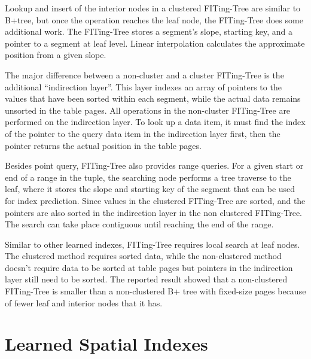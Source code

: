 Lookup and insert of the interior nodes in a clustered FITing-Tree are similar to B+tree, but once the operation reaches the leaf node, the FITing-Tree does some additional work. The FITing-Tree stores a segment's slope, starting key, and a pointer to a segment at leaf level. Linear interpolation calculates the approximate position from a given slope. 

The major difference between a non-cluster and a cluster FITing-Tree is the additional “indirection layer”. This layer indexes an array of pointers to the values that have been sorted within each segment, while the actual data remains unsorted in the table pages. All operations in the non-cluster FITing-Tree are performed on the indirection layer. To look up a data item, it must find the index of the pointer to the query data item in the indirection layer first, then the pointer returns the actual position in the table pages.

Besides point query, FITing-Tree also provides range queries. For a given start or end of a range in the tuple, the searching node performs a tree traverse to the leaf, where it stores the slope and starting key of the segment that can be used for index prediction. Since values in the clustered FITing-Tree are sorted, and the pointers are also sorted in the indirection layer in the non clustered FITing-Tree. The search can take place contiguous until reaching the end of the range. 


Similar to other learned indexes, FITing-Tree requires local search at leaf nodes. The clustered method requires sorted data, while the non-clustered method doesn’t require data to be sorted at table pages but pointers in the indirection layer still need to be sorted. The reported result \cite{galakatos2019fiting} showed that a non-clustered FITing-Tree is smaller than a non-clustered B+ tree with fixed-size pages because of fewer leaf and interior nodes that it has. 



\section{Learned Spatial Indexes}
